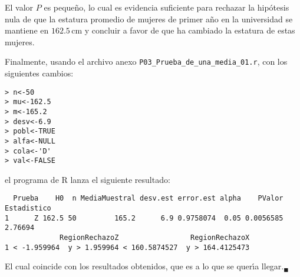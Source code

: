 \begin{solucion}
 \begin{conclusion}
  El valor $P$ es peque\~no, lo cual es evidencia suficiente para rechazar la hip\'otesis nula de que la estatura promedio de mujeres de primer a\~no en la universidad se mantiene en $162.5\,$cm y concluir a favor de que ha cambiado la estatura de estas mujeres.
 \end{conclusion}
 Finalmente, usando el archivo anexo \texttt{P03\_Prueba\_de\_una\_media\_01.r}, con los siguientes cambios:
 \begin{verbatim}
> n<-50
> mu<-162.5
> m<-165.2
> desv<-6.9
> pobl<-TRUE
> alfa<-NULL
> cola<-'D'
> val<-FALSE
 \end{verbatim}
 \vspace{-0.5cm}
 el programa de R lanza el siguiente resultado:
 \begin{verbatim}
  Prueba    H0  n MediaMuestral desv.est error.est alpha    PValor Estadistico
1      Z 162.5 50         165.2      6.9 0.9758074  0.05 0.0056585     2.76694
             RegionRechazoZ                 RegionRechazoX
1 < -1.959964  y > 1.959964 < 160.5874527  y > 164.4125473
 \end{verbatim}
 \vspace{-0.5cm}
 El cual coincide con los resultados obtenidos, que es a lo que se quer\'{\i}a llegar.${}_{\blacksquare}$
\end{solucion}
